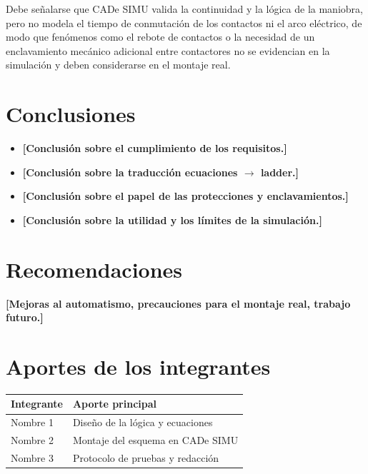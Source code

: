 \documentclass[conference,a4paper,10pt]{IEEEtran}
\begin{document}
Debe señalarse que CADe SIMU valida la continuidad y la lógica de la maniobra,
pero no modela el tiempo de conmutación de los contactos ni el arco eléctrico,
de modo que fenómenos como el rebote de contactos o la necesidad de un
enclavamiento mecánico adicional entre contactores no se evidencian en la
simulación y deben considerarse en el montaje real.

\section{Conclusiones}\label{sec:conclusiones}
\begin{itemize}[leftmargin=1.2em,itemsep=1pt,topsep=2pt]
  \item \textbf{[Conclusión sobre el cumplimiento de los requisitos.]}
  \item \textbf{[Conclusión sobre la traducción ecuaciones $\rightarrow$ ladder.]}
  \item \textbf{[Conclusión sobre el papel de las protecciones y enclavamientos.]}
  \item \textbf{[Conclusión sobre la utilidad y los límites de la simulación.]}
\end{itemize}

\section{Recomendaciones}
\textbf{[Mejoras al automatismo, precauciones para el montaje real,
trabajo futuro.]}

\appendices
\section{Aportes de los integrantes}
\begin{table}[!h]
\renewcommand{\arraystretch}{1.15}
\centering
\footnotesize
\begin{tabular}{@{}ll@{}}
\toprule
\textbf{Integrante} & \textbf{Aporte principal} \\
\midrule
Nombre 1 & Diseño de la lógica y ecuaciones \\
Nombre 2 & Montaje del esquema en CADe SIMU \\
Nombre 3 & Protocolo de pruebas y redacción \\
\bottomrule
\end{tabular}
\end{table}
\end{document}
